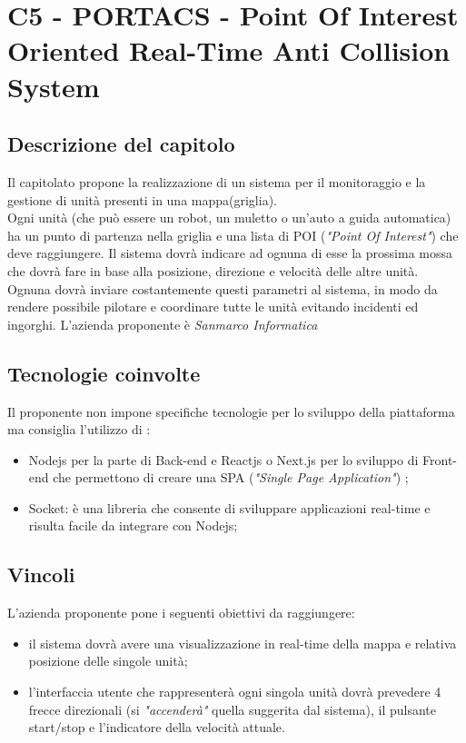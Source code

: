 \section{C5 - PORTACS - Point Of Interest  Oriented Real-Time Anti Collision System}

\subsection{Descrizione del capitolo}
Il capitolato propone la realizzazione di un sistema per il monitoraggio e la gestione di unità presenti in una mappa(griglia).\\
Ogni unità (che può essere un robot, un muletto o un'auto a guida automatica) ha un punto di partenza nella griglia e una lista di POI (\textit{"Point Of Interest"})  che deve raggiungere.
Il sistema dovrà indicare ad ognuna di esse la prossima mossa che dovrà fare in base alla posizione, direzione e velocità  delle altre unità. Ognuna dovrà inviare costantemente questi parametri al sistema, in modo da rendere possibile pilotare e coordinare tutte le unità evitando incidenti ed ingorghi.
L'azienda proponente è \textit{Sanmarco Informatica}

\subsection{Tecnologie coinvolte}
Il proponente non impone specifiche tecnologie per lo sviluppo della piattaforma ma consiglia l'utilizzo di :
\begin{itemize}
\item Nodejs per la parte di Back-end e Reactjs o Next.js  per lo sviluppo di Front-end che permettono di creare una SPA (\textit{"Single Page Application"}) ;
\item Socket: è una libreria che consente di sviluppare applicazioni real-time e risulta facile da integrare con Nodejs;
\end{itemize}

\subsection{Vincoli}
L'azienda proponente pone i seguenti obiettivi da raggiungere:

\begin{itemize}
\item il sistema dovrà avere una visualizzazione in real-time della mappa e relativa posizione delle singole unità;
\item l'interfaccia utente che rappresenterà ogni singola unità  dovrà prevedere 4 frecce direzionali (si \textit{"accenderà"} quella suggerita dal sistema), il pulsante start/stop e l'indicatore della velocità attuale.
\end{itemize}

